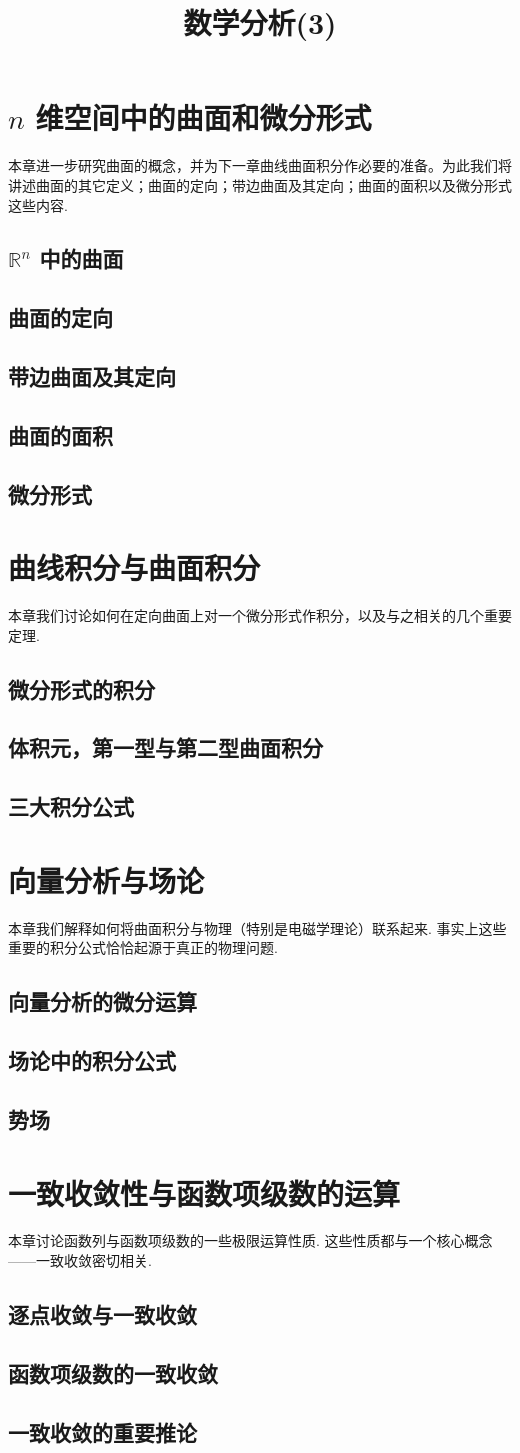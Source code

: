 \documentclass{ctexrep}
\title{数学分析(3)}
\theoremstyle{examplestyle}
\theoremstyle{hintstyle}
\newcommand{\mychapter}[1]{{\color{mydarkblue}\chapter{#1}}}
\newcommand{\mysection}[1]{{\color{mydarkblue}\section{#1}}}
\newcommand{\RR}{\mathbb{R}}
\begin{document}
\maketitle
\tableofcontents

\setcounter{chapter}{11}
\mychapter{$n$ 维空间中的曲面和微分形式}

本章进一步研究曲面的概念，并为下一章曲线曲面积分作必要的准备。为此我们将讲述曲面的其它定义；曲面的定向；带边曲面及其定向；曲面的面积以及微分形式这些内容.

\mysection{$\RR^n$ 中的曲面}



\mysection{曲面的定向}



\mysection{带边曲面及其定向}



\mysection{曲面的面积}



\mysection{微分形式}



\mychapter{曲线积分与曲面积分}

本章我们讨论如何在定向曲面上对一个微分形式作积分，以及与之相关的几个重要定理.

\mysection{微分形式的积分}



\mysection{体积元，第一型与第二型曲面积分}



\mysection{三大积分公式}



\mychapter{向量分析与场论}

本章我们解释如何将曲面积分与物理（特别是电磁学理论）联系起来. 事实上这些重要的积分公式恰恰起源于真正的物理问题.

\mysection{向量分析的微分运算}



\mysection{场论中的积分公式}



\mysection{势场}



\setcounter{chapter}{15}
\mychapter{一致收敛性与函数项级数的运算}

本章讨论函数列与函数项级数的一些极限运算性质. 这些性质都与一个核心概念——一致收敛密切相关.

\mysection{逐点收敛与一致收敛}



\mysection{函数项级数的一致收敛}



\mysection{一致收敛的重要推论}


\end{document}
